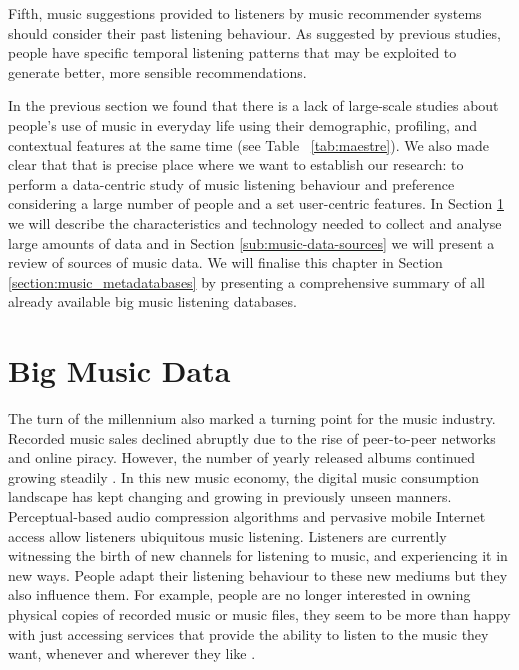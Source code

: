 Fifth, music suggestions provided to listeners by music recommender systems should consider their past listening behaviour. As suggested by previous studies, people have specific temporal listening patterns that may be exploited to generate better, more sensible recommendations.  


In the previous section we found that there is a lack of large-scale studies about people's use of music in everyday life using their demographic, profiling, and contextual features at the same time (see Table ~\ref{tab:maestre}). We also made clear that that is precise place where we want to establish our research: to perform a data-centric study of music listening behaviour and preference considering a large number of people and a set user-centric features.
In Section \ref{sec:3-big-music-data} we will describe the characteristics and technology needed to collect and analyse large amounts of data and in Section \ref{sub:music-data-sources} we will present a review of sources of music data. We will finalise this chapter in Section \ref{section:music_metadatabases} by presenting a comprehensive summary of all already available big music listening databases.








\section{Big Music Data}\label{sec:3-big-music-data}
\graphicspath{{./figs/ch3/} }
The turn of the millennium also marked a turning point for the music industry. Recorded music sales declined abruptly due to the rise of peer-to-peer networks and online piracy. However, the number of yearly released albums continued growing steadily \autocite{frankel14evolution}. 
In this new music economy, the digital music consumption landscape has kept changing and growing in previously unseen manners. 
Perceptual-based audio compression algorithms and pervasive mobile Internet access allow listeners ubiquitous music listening. 
Listeners are currently witnessing the birth of new channels for listening to music, and experiencing it in new ways. People adapt their listening behaviour to these new mediums but they also influence them. For example, people are no longer interested in owning physical copies of recorded music or music files, they seem to be more than happy with just accessing services that provide the ability to listen to the music they want, whenever and wherever they like \autocite{wikstrom13music}.


